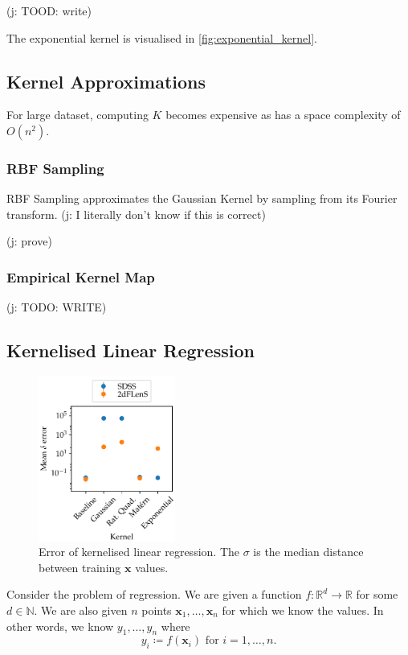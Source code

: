 \documentclass[11pt,twoside]{report}
\newcommand\bx{\mathbf{x}}
\newcommand\bbN{\mathbb{N}}
\newcommand\bbR{\mathbb{R}}
\newcommand\jakub[1]{{\color{red}(j: #1)}}
\begin{document}
\jakub{TOOD: write}

The exponential kernel is visualised in \cref{fig:exponential_kernel}.

\subsection{Kernel Approximations}

For large dataset, computing $K$ becomes expensive as has a space complexity of $O(n^2)$.

\subsubsection{RBF Sampling}

RBF Sampling approximates the Gaussian Kernel by sampling from its Fourier transform. \jakub{I literally don't know if this is correct}

\jakub{prove}

\subsubsection{Empirical Kernel Map}

\jakub{TODO: WRITE}


\subsection{Kernelised Linear Regression}

  \begin{figure}
    \centering
    \includegraphics[width=0.4\textwidth]{linreg_kernelised.pdf}
    \caption{Error of kernelised linear regression. The $\sigma$ is the median distance between training $\bx$ values.}
    \label{fig:linreg_kernelised}
  \end{figure}

Consider the problem of regression. We are given a function $f : \bbR^d \to \bbR$ for some $d \in \bbN$. We are also given $n$ points $\bx_1, \dots, \bx_n$ for which we know the values. In other words, we know $y_1, \dots, y_n$ where \[
    y_i \coloneqq f(\bx_i)\text{ for }i = 1, \dots, n\text{.}
\]
\end{document}
